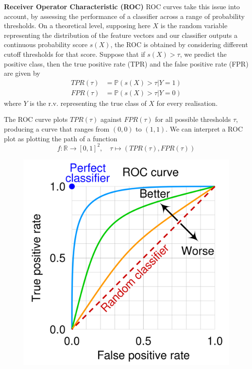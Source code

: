 \textbf{Receiver Operator Characteristic (ROC)}
ROC curves take this issue into account, by assessing the performance of a classifier across a range of probability thresholds.
On a theoretical level, supposing here $X$ is the random variable representing the distribution of the feature vectors 
and our classifier outputs a continuous probability score $s(X)$, the ROC is obtained by considering different cutoff thresholds for that score.
Suppose that if $s(X) > \tau$, we predict the positive class, then the true positive rate (TPR) and the false positive rate (FPR) are given by
\[
    	\begin{aligned}
    		TPR(\tau) &= \mathbb{P}(s(X) > \tau | Y = 1) \\
    		FPR(\tau) &= \mathbb{P}(s(X) > \tau | Y = 0)
    	\end{aligned}
\]
where $Y$ is the r.v. representing the true class of $X$ for every realisation. 

The ROC curve plots $TPR(\tau)$ against $FPR(\tau)$ for all possible thresholds $\tau$, producing a curve that ranges from $(0,0)$ to $(1,1)$.
We can interpret a ROC plot as plotting the path of a function
\[
	f: \mathbb{R} \to [0,1]^2, \quad  \tau \mapsto (TPR(\tau), FPR(\tau))
\]

\begin{figure}[H]
  	\centering
  	\includegraphics[width=0.5\linewidth]{assets/Roc_curve.png}
  	\label{fig:roc_curve}
\end{figure}

